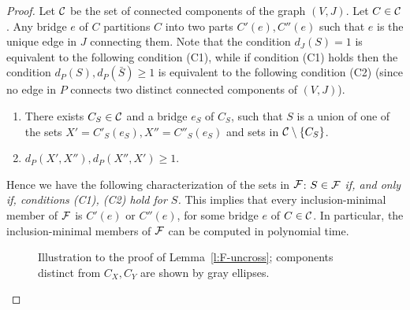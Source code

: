 \documentclass[envcountsame]{llncs}
\begin{document}
\begin{proof}
Let ${\cal C}$ be the set of connected components of the graph $(V,J)$.
Let $C \in {\cal C}$.
Any bridge $e$ of $C$ partitions $C$ into two parts $C'(e),C''(e)$
such that $e$ is the unique edge in $J$ connecting them. 
Note that the condition $d_J(S)=1$ is equivalent to the following condition (C1), 
while if condition (C1) holds then the condition $d_P(S),d_P(\bar{S}) \geq 1$ 
is equivalent to the following condition (C2)
(since no edge in $P$ connects two distinct connected components of $(V,J)$).
\begin{enumerate}[(C1)]
\item
There exists $C_S \in {\cal C}$ and a bridge $e_S$ of $C_S$,
such that $S$ is a union of one of the sets $X'=C'_S(e_S),X''=C''_S(e_S)$
and sets in ${\cal C} \setminus \{C_S\}$.
\item
$d_P(X',X''),d_P(X'',X') \geq 1$.
\end{enumerate}
Hence we have the following characterization of the sets in ${\cal F}$:
{\em $S \in {\cal F}$ if, and only if, conditions (C1), (C2) hold for $S$.} 
This implies that every inclusion-minimal member of ${\cal F}$ is 
$C'(e)$ or $C''(e)$, for some bridge $e$ of $C \in {\cal C}$.
In particular, the inclusion-minimal members of ${\cal F}$ 
can be computed in polynomial time.



\begin{figure} 
\centering 
{}
   \caption{Illustration to the proof of Lemma~\ref{l:F-uncross};
            components distinct from $C_X,C_Y$ are shown by gray ellipses.} 
\label{f:comps}
\end{figure}



\end{proof}
\end{document}

